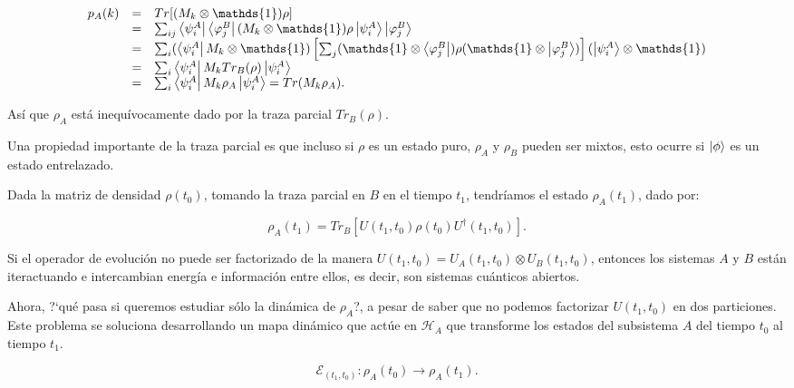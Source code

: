 \begin{equation}
    \begin{array}{r c l}
        p_A(k)
        &=& Tr[(M_k \otimes \mathds{1}) \rho] \\
        &=& \sum_{ij} \bra{\psi_i^A} \bra{\varphi_j^B} (M_k \otimes \mathds{1}) \rho \ket{\psi_i^A} \ket{\varphi_j^B} \\
        &=& \sum_i (\bra{\psi_i^A} M_k \otimes \mathds{1}) \left[\sum_j (\mathds{1} \otimes \bra{\varphi_j^B}) \rho (\mathds{1} \otimes \ket{\varphi_j^B})\right] (\ket{\psi_i^A} \otimes \mathds{1}) \\
        &=& \sum_i \bra{\psi_i^A} M_k Tr_B(\rho) \ket{\psi_i^A} \\
        &=& \sum_i \bra{\psi_i^A} M_k \rho_A \ket{\psi_i^A} = Tr(M_k \rho_A) .
    \end{array}
\end{equation}

Así que $\rho_A$ está inequívocamente dado por la traza parcial $Tr_B(\rho)$.

Una propiedad importante de la traza parcial es que incluso si $\rho$ es un estado puro, $\rho_A$ y $\rho_B$ pueden ser mixtos, esto ocurre si $\ket{\phi}$ es un estado entrelazado.

Dada la matriz de densidad $\rho(t_0)$, tomando la traza parcial en $B$ en el tiempo $t_1$, tendríamos el estado $\rho_A(t_1)$, dado por:

\begin{equation}
    \rho_A(t_1) = Tr_B[U(t_1, t_0) \rho(t_0) U^\dagger(t_1, t_0)] .
    \label{eq:parevol}
\end{equation}

Si el operador de evolución no puede ser factorizado de la manera $U(t_1, t_0) = U_A(t_1, t_0) \otimes U_B(t_1, t_0)$, entonces los sistemas $A$ y $B$ están iteractuando e intercambian energía e información entre ellos, es decir, son sistemas cuánticos abiertos.

Ahora, ?`qué pasa si queremos estudiar sólo la dinámica de $\rho_A$?, a pesar de saber que no podemos factorizar $U(t_1, t_0)$ en dos particiones. Este problema se soluciona desarrollando un mapa dinámico que actúe en $\mathcal{H}_A$ que transforme los estados del subsistema $A$ del tiempo $t_0$ al tiempo $t_1$.

\begin{equation}
    \mathcal{E}_{(t_1, t_0)} : \rho_A(t_0) \rightarrow \rho_A(t_1) .
\end{equation}

